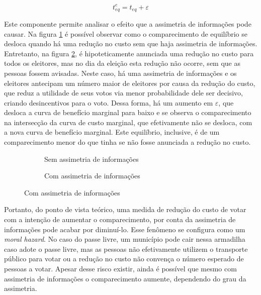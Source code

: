 \begin{equation}
\label{eq_expectativas}
    t_{eq}^{e} = t_{eq} + \varepsilon
\end{equation}

Este componente permite analisar o efeito que a assimetria de informações pode causar. Na figura \ref{fig_static3} é possível observar como o comparecimento de equilíbrio se desloca quando há uma redução no custo sem que haja assimetria de informações. Entretanto, na figura \ref{fig_static4}, é hipoteticamente anunciada uma redução no custo para todos os eleitores, mas no dia da eleição esta redução não ocorre, sem que as pessoas fossem avisadas. Neste caso, há uma assimetria de informações e os eleitores antecipam um número maior de eleitores por causa da redução do custo, que reduz a utilidade de seus votos via menor probabilidade dele ser decisivo, criando desincentivos para o voto. Dessa forma, há um aumento em $\varepsilon$, que desloca a curva de benefício marginal para baixo e se observa o comparecimento na intersecção da curva de custo marginal, que efetivamente não se desloca, com a nova curva de benefício marginal. Este equilíbrio, inclusive, é de um comparecimento menor do que tinha se não fosse anunciada a redução no custo.

\begin{figure}[!ht]
  \caption{Estática comparativa e \textit{moral hazard}}
    \begin{subfigure}[t]{0.45\linewidth}
      
      \caption{Sem assimetria de informações}
      \label{fig_static3}
    \end{subfigure}
    \hfill
    \begin{subfigure}[t]{0.45\linewidth}
      
      \caption{Com assimetria de informações}
      \label{fig_static4}
    \end{subfigure}
    \label{fig_staticB}
  \end{figure}

Portanto, do ponto de vista teórico, uma medida de redução do custo de votar com a intenção de aumentar o comparecimento, por conta da assimetria de informações pode acabar por diminuí-lo. Esse fenômeno se configura como um \textit{moral hazard}. No caso do passe livre, um município pode cair nessa armadilha caso adote o passe livre, mas as pessoas não efetivamente utilizem o transporte público para votar ou a redução no custo não convença o número esperado de pessoas a votar. Apesar desse risco existir, ainda é possível que mesmo com assimetria de informações o comparecimento aumente, dependendo do grau da assimetria.  
  
